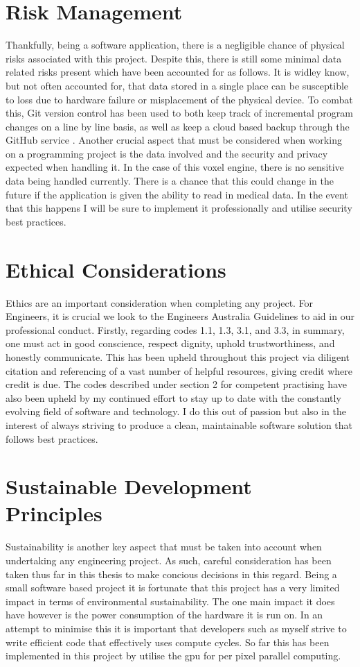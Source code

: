 \documentclass[titlepage]{article}
\begin{document}
\section{Risk Management}
Thankfully, being a software application, there is a negligible chance of physical risks associated with this project. Despite this, there is still some minimal data related risks present which have been accounted for as follows. It is widley know, but not often accounted for, that data stored in a single place can be susceptible to loss due to hardware failure or misplacement of the physical device. To combat this, Git version control has been used to both keep track of incremental program changes on a line by line basis, as well as keep a cloud based backup through the GitHub service \cite{github}. Another crucial aspect that must be considered when working on a programming project is the data involved and the security and privacy expected when handling it. In the case of this voxel engine, there is no sensitive data being handled currently. There is a chance that this could change in the future if the application is given the ability to read in medical data. In the event that this happens I will be sure to implement it professionally and utilise security best practices.

\section{Ethical Considerations}
Ethics are an important consideration when completing any project. For Engineers, it is crucial we look to the Engineers Australia Guidelines \cite{ethics} to aid in our professional conduct. Firstly, regarding codes 1.1, 1.3, 3.1, and 3.3, in summary, one must act in good conscience, respect dignity, uphold trustworthiness, and honestly communicate. This has been upheld throughout this project via diligent citation and referencing of a vast number of helpful resources, giving credit where credit is due. The codes described under section 2 for competent practising have also been upheld by my continued effort to stay up to date with the constantly evolving field of software and technology. I do this out of passion but also in the interest of always striving to produce a clean, maintainable software solution that follows best practices.

\section{Sustainable Development Principles}
Sustainability is another key aspect that must be taken into account when undertaking any engineering project. As such, careful consideration has been taken thus far in this thesis to make concious decisions in this regard. Being a small software based project it is fortunate that this project has a very limited impact in terms of environmental sustainability. The one main impact it does have however is the power consumption of the hardware it is run on. In an attempt to minimise this it is important that developers such as myself strive to write efficient code that effectively uses compute cycles. So far this has been implemented in this project by utilise the \acrshort{gpu} for per pixel parallel computing.
\end{document}
